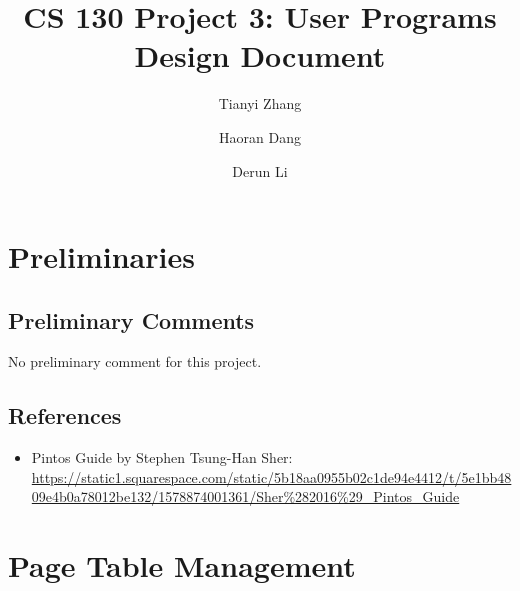 \documentclass[sigconf, nonacm, balance=false, urlbreakonhyphens=true]{acmart}
\begin{document}
    \title{CS 130 Project 3: User Programs\\Design Document}

    \author{Tianyi Zhang}

    \author{Haoran Dang}

    \author{Derun Li}

    \maketitle

    \setcounter{section}{-1}

    \section{Preliminaries}
        \subsection{Preliminary Comments}

        No preliminary comment for this project. 

        \subsection{References}
        
            \begin{itemize}
                \item Pintos Guide by Stephen Tsung-Han Sher:  \url{https://static1.squarespace.com/static/5b18aa0955b02c1de94e4412/t/5e1bb4809e4b0a78012be132/1578874001361/Sher\%282016%29_Pintos_Guide}
            \end{itemize} 
    
    \section{Page Table Management}
            
\end{document}

